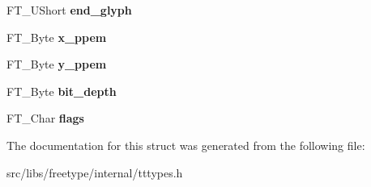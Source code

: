 \begin{DoxyCompactItemize}
\item 
\hypertarget{struct_t_t___s_bit___strike_rec___a1af21e0ef936193b22575ea75bad487f}{
FT\_\-UShort {\bfseries end\_\-glyph}}
\label{struct_t_t___s_bit___strike_rec___a1af21e0ef936193b22575ea75bad487f}

\item 
\hypertarget{struct_t_t___s_bit___strike_rec___a2a1b17c24df2084fe485aefe8f34e7d4}{
FT\_\-Byte {\bfseries x\_\-ppem}}
\label{struct_t_t___s_bit___strike_rec___a2a1b17c24df2084fe485aefe8f34e7d4}

\item 
\hypertarget{struct_t_t___s_bit___strike_rec___ad618814b841b86e7763f1aa371e04fed}{
FT\_\-Byte {\bfseries y\_\-ppem}}
\label{struct_t_t___s_bit___strike_rec___ad618814b841b86e7763f1aa371e04fed}

\item 
\hypertarget{struct_t_t___s_bit___strike_rec___ac57b360af4620bd06251d098f5da23bb}{
FT\_\-Byte {\bfseries bit\_\-depth}}
\label{struct_t_t___s_bit___strike_rec___ac57b360af4620bd06251d098f5da23bb}

\item 
\hypertarget{struct_t_t___s_bit___strike_rec___a38735f8c00b23deb25ffab798c0aa7b7}{
FT\_\-Char {\bfseries flags}}
\label{struct_t_t___s_bit___strike_rec___a38735f8c00b23deb25ffab798c0aa7b7}

\end{DoxyCompactItemize}


The documentation for this struct was generated from the following file:\begin{DoxyCompactItemize}
\item 
src/libs/freetype/internal/tttypes.h\end{DoxyCompactItemize}
